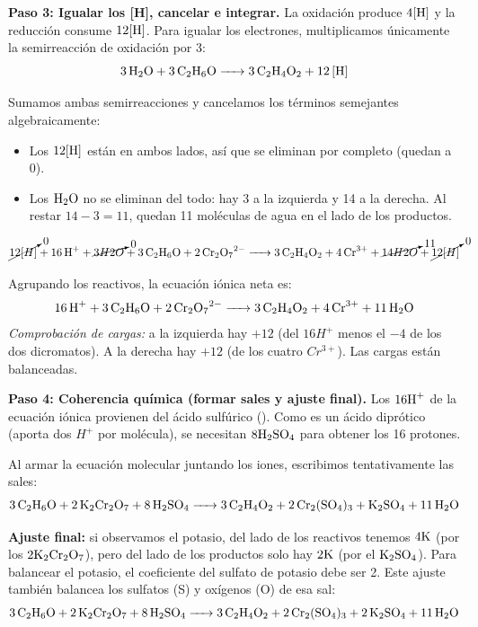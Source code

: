 \vspace{0.5cm}

\textbf{Paso 3: Igualar los [H], cancelar e integrar.}
La oxidación produce \(4 \ce{[H]}\) y la reducción consume \(12 \ce{[H]}\). Para igualar los electrones, multiplicamos únicamente la semirreacción de oxidación por 3:
\[
\ce{3H2O + 3C2H6O -> 3C2H4O2 + 12[H]}
\]

Sumamos ambas semirreacciones y cancelamos los términos semejantes algebraicamente:
\begin{itemize}
    \item Los \(12 \ce{[H]}\) están en ambos lados, así que se eliminan por completo (quedan a 0).
    \item Los \(\ce{H2O}\) no se eliminan del todo: hay 3 a la izquierda y 14 a la derecha. Al restar \(14 - 3 = 11\), quedan 11 moléculas de agua en el lado de los productos.
\end{itemize}

\[
\ce{\cancelto{0}{12[H]} + 16H+ + \cancelto{0}{3H2O} + 3C2H6O + 2Cr2O7^{2-} -> 3C2H4O2 + 4Cr^{3+} + \cancelto{11}{14H2O} + \cancelto{0}{12[H]}}
\]

Agrupando los reactivos, la ecuación iónica neta es:
\[
\ce{16H+ + 3C2H6O + 2Cr2O7^{2-} -> 3C2H4O2 + 4Cr^{3+} + 11H2O}
\]
\textit{Comprobación de cargas:} a la izquierda hay $+12$ (del \(16H^+\) menos el \(-4\) de los dos dicromatos). A la derecha hay $+12$ (de los cuatro \(Cr^{3+}\)). Las cargas están balanceadas.

\vspace{0.5cm}

\textbf{Paso 4: Coherencia química (formar sales y ajuste final).}
Los $16 \ce{H+}$ de la ecuación iónica provienen del ácido sulfúrico (). Como es un ácido diprótico (aporta dos \(H^+\) por molécula), se necesitan $8 \ce{H2SO4}$ para obtener los 16 protones. 

Al armar la ecuación molecular juntando los iones, escribimos tentativamente las sales:
\[
\ce{3C2H6O + 2K2Cr2O7 + 8H2SO4 -> 3C2H4O2 + 2Cr2(SO4)3 + K2SO4 + 11H2O}
\]

\textbf{Ajuste final:} si observamos el potasio, del lado de los reactivos tenemos $4 \ce{K}$ (por los $2\ce{K2Cr2O7}$), pero del lado de los productos solo hay $2 \ce{K}$ (por el $\ce{K2SO4}$). Para balancear el potasio, el coeficiente del sulfato de potasio debe ser 2. Este ajuste también balancea los sulfatos (S) y oxígenos (O) de esa sal:
\[
\ce{3C2H6O + 2K2Cr2O7 + 8H2SO4 -> 3C2H4O2 + 2Cr2(SO4)3 + 2K2SO4 + 11H2O}
\]


